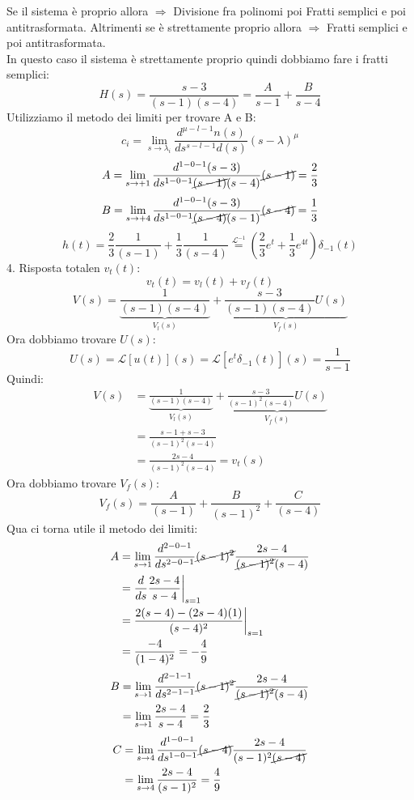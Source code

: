 \documentclass[a4paper]{article}
\begin{document}
Se il sistema è proprio allora $\Longrightarrow$ Divisione fra polinomi poi Fratti semplici e poi antitrasformata. Altrimenti
se è strettamente proprio allora $\Longrightarrow$ Fratti semplici e poi antitrasformata.\\
In questo caso il sistema è strettamente proprio quindi dobbiamo fare i fratti semplici:
\[H(s) = \frac{s-3}{(s-1)(s-4)} = \frac{A}{s-1} + \frac{B}{s-4}\]
Utilizziamo il metodo dei limiti per trovare A e B: 
\[c_{i} = \lim_{s \rightarrow \lambda_i}\frac{d^{\mu - l - 1}n(s)}{ds^{s-l-1}d(s)}(s-\lambda)^\mu\]
\[A = \lim_{s \rightarrow +1}\frac{d^{1 - 0 - 1}(s-3)}{ds^{1-0-1}\cancel{(s-1)}(s-4)}\cancel{(s-1)} = \frac{2}{3}\]
\[B = \lim_{s \rightarrow +4}\frac{d^{1 - 0 - 1}(s-3)}{ds^{1-0-1}\cancel{(s-4)}(s-1)}\cancel{(s-4)} = \frac{1}{3}\]
\[h(t) = \frac{2}{3}\frac{1}{(s-1)} + \frac{1}{3}\frac{1}{(s-4)} \stackrel{\mathcal{L}^{-1}}{=} \left(\frac{2}{3}e^t + \frac{1}{3}e^{4t}\right)\delta_{-1}(t)\]
4. Risposta totalen $v_t(t)$:
\[v_t(t) = v_l(t) + v_f(t)\]
\[V(s) = \underbrace{\frac{1}{(s-1)(s-4)}}_{V_l(s)} + \underbrace{\frac{s-3}{(s-1)(s-4)}U(s)}_{V_f(s)}\]
Ora dobbiamo trovare $U(s)$:
\[U(s) = \mathcal{L}[u(t)](s) = \mathcal{L}[e^t\delta_{-1}(t)](s) = \frac{1}{s-1}\]
Quindi: 
\begin{align*}
V(s) &= \underbrace{\frac{1}{(s-1)(s-4)}}_{V_l(s)} + \underbrace{\frac{s-3}{(s-1)^2(s-4)}U(s)}_{V_f(s)}\\
&= \frac{s-1 + s-3}{(s-1)^2(s-4)}\\
& = \frac{2s - 4}{(s-1)^2(s-4)} = v_t(s)
\end{align*}
Ora dobbiamo trovare $V_f(s)$:
\[V_f(s) = \frac{A}{(s-1)} + \frac{B}{(s-1)^2} + \frac{C}{(s-4)}\]
Qua ci torna utile il metodo dei limiti:
\begin{align*}
A &= \lim_{s \rightarrow 1} \frac{d^{2-0-1}}{ds^{2-0-1}} \cancel{(s-1)^2}\frac{2s-4}{\cancel{(s-1)^2}(s-4)}\\
&= \frac{d}{ds} \frac{2s - 4}{s-4}\bigg|_{s=1} \\
&= \frac{2(s-4) - (2s-4)(1)}{(s-4)^2}\bigg|_{s=1}\\
&= \frac{-4}{(1-4)^2} = -\frac{4}{9}
\end{align*}
\begin{align*}
B &= \lim_{s \rightarrow 1} \frac{d^{2-1-1}}{ds^{2-1-1}} \cancel{(s-1)^2}\frac{2s-4}{\cancel{(s-1)^2}(s-4)}\\
&= \lim_{s \rightarrow 1} \frac{2s - 4}{s-4} = \frac{2}{3}\\
\end{align*}
\begin{align*}
C &= \lim_{s \rightarrow 4} \frac{d^{1-0-1}}{ds^{1-0-1}} \cancel{(s-4)}\frac{2s-4}{(s-1)^2\cancel{(s-4)}}\\
&= \lim_{s \rightarrow 4} \frac{2s-4}{(s-1)^2} = \frac{4}{9}
\end{align*}
\end{document}
